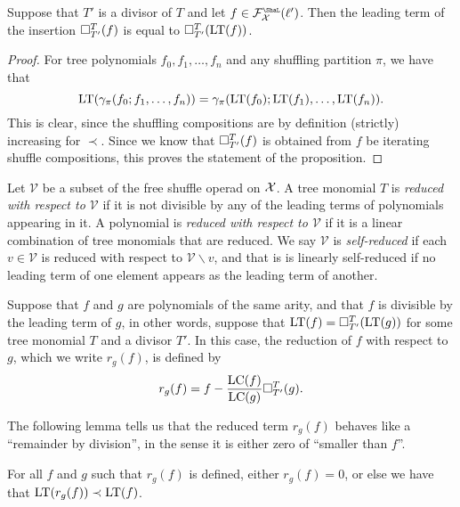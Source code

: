 		
\begin{proposition}\label{prop:repllead}
Suppose that $T'$ is a divisor of $T$ and let $f\in \FF_\XX^\Sha(\ell')$.
Then the leading term of the insertion $\square_{T'}^{T}(f) $
is equal to $\square_{T'}^{T}(\operatorname{LT}(f))$.
\end{proposition}

\begin{proof}
For tree polynomials $f_0,f_1,\ldots,
f_n$ and any shuffling partition $\pi$, we have that
\[ \operatorname{LT}(\gamma_\pi(f_0;f_1,\ldots,f_n) )= 
 		\gamma_\pi(\operatorname{LT}(f_0);\operatorname{LT}(f_1),\ldots,\operatorname{LT}(f_n)).
 		\]
This is clear, since the shuffling compositions are by definition
(strictly) increasing for $\prec$. Since we know that $\square_{T'}^{T}(f)$
is obtained from $f$ be iterating shuffle compositions, this proves
the statement of the proposition. 
\end{proof}

Let $\mathcal{V}$ be a subset of the free shuffle operad on $\mathcal{X}$. A
tree monomial $T$ is \emph{reduced with respect to $\mathcal{V}$} if it is
not divisible by any of the leading terms of polynomials appearing in it.
A polynomial is \emph{reduced with respect to $\mathcal V$} if it is a linear
combination of tree monomials that are reduced. We say $\mathcal V$
is \emph{self-reduced} if each $v\in \mathcal V$ is reduced with respect to
$\mathcal V\smallsetminus v$, and that is is linearly self-reduced
if no leading term of one element appears as the leading term of 
another. 

\begin{definition}[Reduction]\label{def:reduce}
Suppose that $f$ and $g$ are polynomials of the same arity, and
that $f$ is divisible by the leading term of $g$, in other words,
suppose that $\operatorname{LT}(f) = \square_{T'}^{T}(\operatorname{LT}(g))$ for some
tree monomial $T$ and a divisor $T'$. In this case,
the reduction of $f$ with respect to $g$, which we write
$r_g(f)$, is defined by
\[
r_g(f) = f - \frac{\operatorname{LC}(f)}{\operatorname{LC}(g)} \square_{T'}^{T}(g).
\]
\end{definition}

The following lemma tells us that the reduced term $r_g(f)$ 
behaves like a ``remainder by division'', in the sense it is
either zero of ``smaller than $f$''.

\begin{lemma}\label{lemma:smaller}
For all $f$ and $g$ such that $r_g(f)$ is defined, either
$r_g(f)= 0$, or else we have that $\operatorname{LT}(r_g(f)) \prec \operatorname{LT}(f)$.
\end{lemma}

